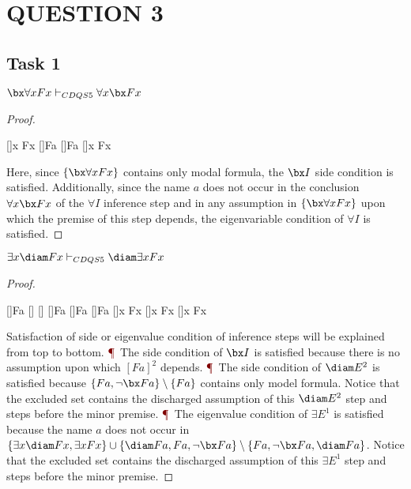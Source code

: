 \section*{QUESTION 3}
\theoremstyle{definition}
\newtheorem{definition}{Definition}
\newtheorem{theorem}{Theorem}

\subsection*{Task 1}
\begin{claim}
$\bx \forall x Fx \vdash_{CDQS5} \forall x \bx Fx$
\end{claim}

\begin{proof}
\begin{prooftree*}
[\boxe]{\forall x Fx}
[\une]{Fa}
[\boxi]{\bx Fa}
[\uni]{\forall x \bx Fx}
\end{prooftree*}
Here, since $\{ \bx \forall x Fx \}$ contains only modal formula, the $\bx I$ side condition is satisfied.
Additionally, since the name $a$ does not occur in the conclusion $\forall x \bx Fx$ of the $\forall I$ inference step and in any assumption in $\{ \bx \forall x Fx \}$ upon which the premise of this step depends, the eigenvariable condition of $\forall I$ is satisfied.
\end{proof}

\begin{claim}
$\exists x \diam Fx \vdash_{CDQS5} \diam \exists x Fx$
\end{claim}

\begin{proof}
\begin{prooftree*}
[\boxi]{\bx Fa}
[\nege]{\bot}
[]{\bot}
[]{\neg \neg \bx Fa}
[\dne]{\bx Fa}
[\boxe]{Fa}
[\exi]{\exists x Fx}
[]{\exists x Fx}
[\diami]{\diam \exists x Fx}
\end{prooftree*}
Satisfaction of side or eigenvalue condition of inference steps will be explained from top to bottom. \textcolor{Maroon}{\P}\
The side condition of $\bx I$ is satisfied because there is no assumption upon which $[Fa]^2$ depends. \textcolor{Maroon}{\P}\
The side condition of $\diam E^2$ is satisfied because $\{ Fa, \neg \bx Fa \} \setminus \{ Fa \}$ contains only model formula. Notice that the excluded set contains the discharged assumption of this $\diam E^2$ step and steps before the minor premise. \textcolor{Maroon}{\P}\
The eigenvalue condition of $\exists E^1$ is satisfied because the name $a$ does not occur in $\{ \exists x \diam Fx, \exists x Fx \} \cup \{ \diam Fa, Fa, \neg \bx Fa \} \setminus \{ Fa, \neg \bx Fa, \diam Fa \}$. Notice that the excluded set contains the discharged assumption of this $\exists E^1$ step and steps before the minor premise.
\end{proof}

